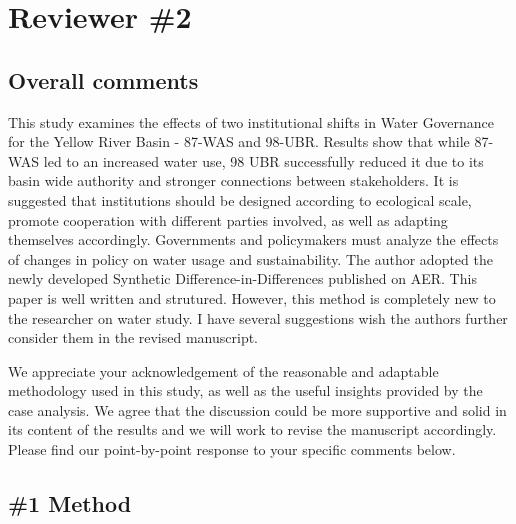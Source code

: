 \section{Reviewer \#2}\label{reviewer_2}

\subsection*{Overall comments}
\RC{} This study examines the effects of two institutional shifts in Water Governance for the Yellow River Basin - 87-WAS and 98-UBR. Results show that while 87-WAS led to an increased water use, 98 UBR successfully reduced it due to its basin wide authority and stronger connections between stakeholders. It is suggested that institutions should be designed according to ecological scale, promote cooperation with different parties involved, as well as adapting themselves accordingly. Governments and policymakers must analyze the effects of changes in policy on water usage and sustainability. The author adopted the newly developed Synthetic Difference-in-Differences published on AER. This paper is well written and strutured. However, this method is completely new to the researcher on water study. I have several suggestions wish the authors further consider them in the revised manuscript.

\AR{} We appreciate your acknowledgement of the reasonable and adaptable methodology used in this study, as well as the useful insights provided by the case analysis. We agree that the discussion could be more supportive and solid in its content of the results and we will work to revise the manuscript accordingly. Please find our point-by-point response to your specific comments below.

\subsection{\#1 Method}


